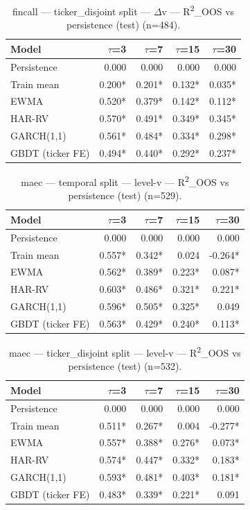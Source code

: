 \begin{table}[t]
\centering
\begin{tabular}{lrrrr}
\toprule
Model & $\tau$=3 & $\tau$=7 & $\tau$=15 & $\tau$=30 \\
\midrule
Persistence & 0.000 & 0.000 & 0.000 & 0.000 \\
Train mean & 0.200* & 0.201* & 0.132* & 0.035* \\
EWMA & 0.520* & 0.379* & 0.142* & 0.112* \\
HAR-RV & 0.570* & 0.491* & 0.349* & 0.345* \\
GARCH(1,1) & 0.561* & 0.484* & 0.334* & 0.298* \\
GBDT (ticker FE) & 0.494* & 0.440* & 0.292* & 0.237* \\
\bottomrule
\end{tabular}
\caption{fincall — ticker\_disjoint split — $\Delta$v — R\textsuperscript{2}\_OOS vs persistence (test) (n=484).}
\end{table}

\begin{table}[t]
\centering
\begin{tabular}{lrrrr}
\toprule
Model & $\tau$=3 & $\tau$=7 & $\tau$=15 & $\tau$=30 \\
\midrule
Persistence & 0.000 & 0.000 & 0.000 & 0.000 \\
Train mean & 0.557* & 0.342* & 0.024 & -0.264* \\
EWMA & 0.562* & 0.389* & 0.223* & 0.087* \\
HAR-RV & 0.603* & 0.486* & 0.321* & 0.221* \\
GARCH(1,1) & 0.596* & 0.505* & 0.325* & 0.049 \\
GBDT (ticker FE) & 0.563* & 0.429* & 0.240* & 0.113* \\
\bottomrule
\end{tabular}
\caption{maec — temporal split — level-v — R\textsuperscript{2}\_OOS vs persistence (test) (n=529).}
\end{table}

\begin{table}[t]
\centering
\begin{tabular}{lrrrr}
\toprule
Model & $\tau$=3 & $\tau$=7 & $\tau$=15 & $\tau$=30 \\
\midrule
Persistence & 0.000 & 0.000 & 0.000 & 0.000 \\
Train mean & 0.511* & 0.267* & 0.004 & -0.277* \\
EWMA & 0.557* & 0.388* & 0.276* & 0.073* \\
HAR-RV & 0.574* & 0.447* & 0.332* & 0.183* \\
GARCH(1,1) & 0.593* & 0.481* & 0.403* & 0.181* \\
GBDT (ticker FE) & 0.483* & 0.339* & 0.221* & 0.091 \\
\bottomrule
\end{tabular}
\caption{maec — ticker\_disjoint split — level-v — R\textsuperscript{2}\_OOS vs persistence (test) (n=532).}
\end{table}

